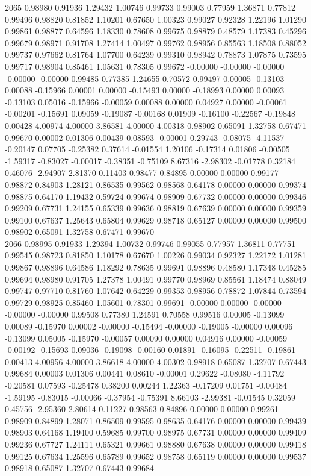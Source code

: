{2065 0.98980 0.91936 1.29432 1.00746 0.99733 0.99003 0.77959 1.36871 0.77812 0.99496 0.98820 0.81852 1.10201 0.67650 1.00323 0.99027 0.92328 1.22196 1.01290 0.99861 0.98877 0.64596 1.18330 0.78608 0.99675 0.98879 0.48579 1.17383 0.45296 0.99679 0.98971 0.91708 1.27414 1.00497 0.99762 0.98956 0.85563 1.18508 0.88052 0.99737 0.97662 0.81764 1.07700 0.64239 0.99310 0.98942 0.78873 1.07875 0.73595 0.99717 0.98904 0.85461 1.05631 0.78305 0.99672 -0.00000 -0.00000 -0.00000 -0.00000 -0.00000 0.99485 0.77385 1.24655 0.70572 0.99497 0.00005 -0.13103 0.00088 -0.15966 0.00001 0.00000 -0.15493 0.00000 -0.18993 0.00000 0.00093 -0.13103 0.05016 -0.15966 -0.00059 0.00088 0.00000 0.04927 0.00000 -0.00061 -0.00201 -0.15691 0.09059 -0.19087 -0.00168 0.01909 -0.16100 -0.22567 -0.19848 0.00428 4.00974 4.00000 3.86581 4.00000 4.00318 0.98902 0.65091 1.32758 0.67471 0.99670 0.00002 0.01306 0.00439 0.08593 -0.00001 0.29743 -0.08075 -4.11537 -0.20147 0.07705 -0.25382 0.37614 -0.01554 1.20106 -0.17314 0.01806 -0.00505 -1.59317 -0.83027 -0.00017 -0.38351 -0.75109 8.67316 -2.98302 -0.01778 0.32184 0.46076 -2.94907 2.81370 0.11403 0.98477 0.84895 0.00000 0.00000 0.99177 0.98872 0.84903 1.28121 0.86535 0.99562 0.98568 0.64178 0.00000 0.00000 0.99374 0.98875 0.64170 1.19432 0.59724 0.99674 0.98909 0.67732 0.00000 0.00000 0.99346 0.99209 0.67731 1.24155 0.65339 0.99636 0.98819 0.67639 0.00000 0.00000 0.99359 0.99100 0.67637 1.25643 0.65804 0.99629 0.98718 0.65127 0.00000 0.00000 0.99500 0.98902 0.65091 1.32758 0.67471 0.99670 \\
2066 0.98995 0.91933 1.29394 1.00732 0.99746 0.99055 0.77957 1.36811 0.77751 0.99545 0.98723 0.81850 1.10178 0.67670 1.00226 0.99034 0.92327 1.22172 1.01281 0.99867 0.98896 0.64586 1.18292 0.78635 0.99691 0.98896 0.48580 1.17348 0.45285 0.99694 0.98980 0.91705 1.27378 1.00491 0.99770 0.98969 0.85561 1.18474 0.88049 0.99747 0.97710 0.81760 1.07642 0.64229 0.99353 0.98956 0.78872 1.07844 0.73594 0.99729 0.98925 0.85460 1.05601 0.78301 0.99691 -0.00000 0.00000 -0.00000 -0.00000 -0.00000 0.99508 0.77380 1.24591 0.70558 0.99516 0.00005 -0.13099 0.00089 -0.15970 0.00002 -0.00000 -0.15494 -0.00000 -0.19005 -0.00000 0.00096 -0.13099 0.05005 -0.15970 -0.00057 0.00090 0.00000 0.04916 0.00000 -0.00059 -0.00192 -0.15693 0.09036 -0.19098 -0.00160 0.01891 -0.16095 -0.22511 -0.19861 0.00413 4.00956 4.00000 3.86618 4.00000 4.00302 0.98918 0.65087 1.32707 0.67443 0.99684 0.00003 0.01306 0.00441 0.08610 -0.00001 0.29622 -0.08080 -4.11792 -0.20581 0.07593 -0.25478 0.38200 0.00244 1.22363 -0.17209 0.01751 -0.00484 -1.59195 -0.83015 -0.00066 -0.37954 -0.75391 8.66103 -2.99381 -0.01545 0.32059 0.45756 -2.95360 2.80614 0.11227 0.98563 0.84896 0.00000 0.00000 0.99261 0.98909 0.84899 1.28071 0.86509 0.99595 0.98635 0.64176 0.00000 0.00000 0.99439 0.98903 0.64168 1.19400 0.59685 0.99700 0.98975 0.67731 0.00000 0.00000 0.99409 0.99236 0.67727 1.24111 0.65321 0.99661 0.98880 0.67638 0.00000 0.00000 0.99418 0.99125 0.67634 1.25596 0.65789 0.99652 0.98758 0.65119 0.00000 0.00000 0.99537 0.98918 0.65087 1.32707 0.67443 0.99684 \\
}
